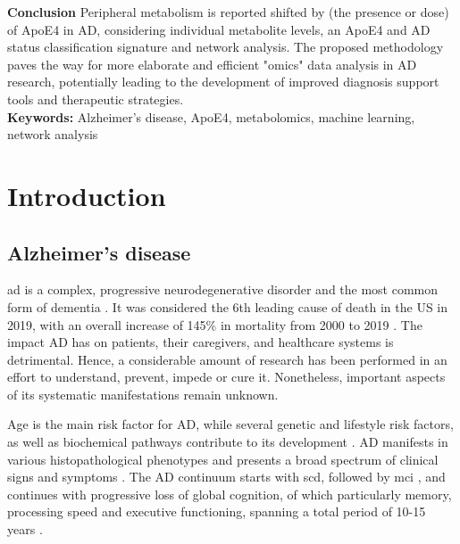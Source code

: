 \documentclass{amsart}
\newcommand{\mainmatter}{
    \newpage
    \pagenumbering{arabic}  %
}
\begin{document}
\textbf{Conclusion}\hspace{.1cm} Peripheral metabolism is reported shifted by (the presence or dose) of ApoE4 in AD, considering individual metabolite levels, an ApoE4 and AD status classification signature and network analysis. The proposed methodology paves the way for more elaborate and efficient "omics" data analysis in AD research, potentially leading to the development of improved diagnosis support tools and therapeutic strategies.\\

\textbf{Keywords:}\hspace{.1cm} Alzheimer's disease, ApoE4, metabolomics, machine learning, network analysis 

\restoregeometry
\clearpage
\printacronyms[title = Abbreviations, toctitle = ABBREVIATIONS]

\newpage
\tableofcontents

\mainmatter

\newpage
\section{Introduction}\label{Intro}
\subsection{Alzheimer’s disease}
\acrfull{ad} is a complex, progressive neurodegenerative disorder and the most common form of dementia \cite{Penke2023NewDisease}. It was considered the 6th leading cause of death in the US in 2019, with an overall increase of 145\% in mortality from 2000 to 2019 \cite{20232023Figures}. The impact AD has on patients, their caregivers, and healthcare systems is detrimental. Hence, a considerable amount of research has been performed in an effort to understand, prevent, impede or cure it. Nonetheless, important aspects of its systematic manifestations remain unknown.

Age is the main risk factor for AD, while several genetic and lifestyle risk factors, as well as biochemical pathways contribute to its development \cite{Penke2023NewDisease}. AD manifests in various histopathological phenotypes and presents a broad spectrum of clinical signs and symptoms \cite{Heneka2015NeuroinflammationDisease, Edwards2019ANeurodegeneration}. The AD continuum starts with \acrfull{scd}, followed by \acrfull{mci} \cite*{AALDIJK2022101556}, and continues with progressive loss of global cognition, of which particularly memory, processing speed and executive functioning, spanning a total period of 10-15 years \cite{Scheltens2016AlzheimersDisease}. 
\end{document}
